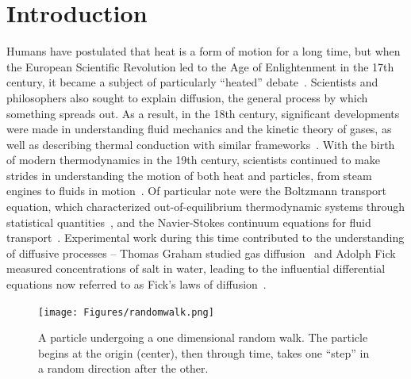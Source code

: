 \chapter{Introduction}
\label{ch1_intro}

Humans have postulated that heat is a form of motion for a long time, but when the European Scientific Revolution led to the Age of Enlightenment in the 17th century, it became a subject of particularly ``heated'' debate~\cite{bacon_novum_1902,boyle_new_1660,halley_historical_1686,newton_vii_1997}. Scientists and philosophers also sought to explain diffusion, the general process by which something spreads out. As a result, in the 18th century, significant developments were made in understanding fluid mechanics and the kinetic theory of gases, as well as describing thermal conduction with similar frameworks~\cite{du_chatelet_dissertation_1744,bernoulli_hydrodynamica_1738,lomonosov_mikhail_1970}. With the birth of modern thermodynamics in the 19th century, scientists continued to make strides in understanding the motion of both heat and particles, from steam engines to fluids in motion~\cite{sadi_carnot_reflexions_1824,thomson_dynamical_1851,rudolf_clausius_mechanical_1867,fourier_analytical_1878,maxwell_theory_1908,joule_scientific_2011}. Of particular note were the Boltzmann transport equation, which characterized out-of-equilibrium thermodynamic systems through statistical quantities~\cite{boltzmann_weitere_1872}, and the Navier-Stokes continuum equations for fluid transport~\cite{navier_memoire_1827,stokes_effect_1851}. Experimental work during this time contributed to the understanding of diffusive processes -- Thomas Graham studied gas diffusion~\cite{graham_xxvii_1833} and Adolph Fick measured concentrations of salt in water, leading to the influential differential equations now referred to as Fick's laws of diffusion~\cite{fick_v_1855}.

\begin{figure}[ht]
\begin{center}
\texttt{[image: Figures/randomwalk.png]}
\caption{\label{fig:walk} A particle undergoing a one dimensional random walk. The particle begins at the origin (center), then through time, takes one ``step'' in a random direction after the other. }
\end{center}
\end{figure}

